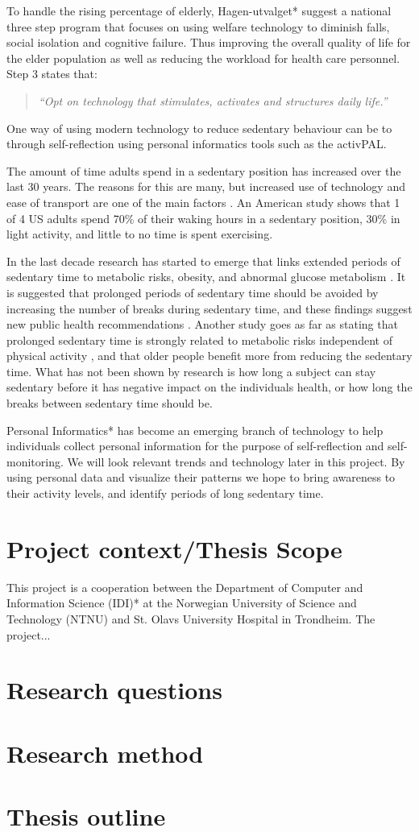 To handle the rising percentage of elderly, Hagen-utvalget* suggest a national three step program that focuses on using welfare technology to diminish falls, social isolation and cognitive failure. Thus improving the overall quality of life for the elder population as well as reducing the workload for health care personnel. Step 3 states that:
\begin{quote}
\textit{``Opt on technology that stimulates, activates and structures daily life.''}
\end{quote}
One way of using modern technology to reduce sedentary behaviour can be to through self-reflection using personal informatics tools such as the activPAL. %

The amount of time adults spend in a sedentary position has increased over the last 30 years. The reasons for this are many, but increased use of technology and ease of transport are one of the main factors \cite{sedentaryBehaviour}. An American study shows that 1 of 4 US adults spend 70\% of their waking hours in a sedentary position, 30\% in light activity, and little to no time is spent exercising.

In the last decade research has started to emerge that links extended periods of sedentary time to metabolic risks\cite{sedentaryTime}, obesity, and abnormal glucose metabolism \cite{breaksSedentary}. It is suggested that prolonged periods of sedentary time should be avoided by increasing the number of breaks during sedentary time, and these findings suggest new public health recommendations \cite{breaksSedentary}. Another study goes as far as stating that prolonged sedentary time is strongly related to metabolic risks independent of physical activity \cite{sedentaryActivity}, and that older people benefit more from reducing the sedentary time. What has not been shown by research is how long a subject can stay sedentary before it has negative impact on the individuals health, or how long the breaks between sedentary time should be.

Personal Informatics* has become an emerging branch of technology to help individuals collect personal information for the purpose of self-reflection and self-monitoring. We will look relevant trends and technology later in this project. By using personal data and visualize their patterns we hope to bring awareness to their activity levels, and identify periods of long sedentary time. 

\section{Project context/Thesis Scope}
This project is a cooperation between the Department of Computer and Information Science (IDI)* at the Norwegian University of Science and Technology (NTNU) and St. Olavs University Hospital in Trondheim. The project...

\section{Research questions}

\section{Research method}

\section{Thesis outline}
